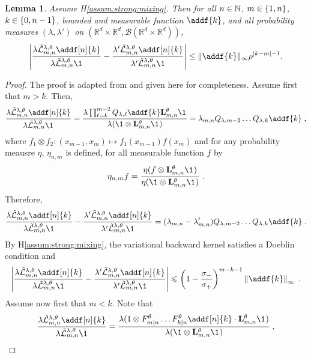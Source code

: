 \documentclass{article}
\newtheorem{lemma}[theorem]{Lemma}
\begin{document}
\begin{lemma} \label{lem:geo:bound}
Assume H\ref{assum:strong:mixing}. Then for all $n \in \mathbb{N}$, $m \in \{ 1, n \}$, $k \in \{ 0, n - 1 \}$, bounded and measurable function $\addf{k}$, and all probability measures $(\lambda, \lambda')$ on $(\mathbb{R}^d\times\mathbb{R}^d,\mathcal{B}(\mathbb{R}^d\times \mathbb{R}^d))$, 
$$
\left|\frac{\lambda \tilde{\mathcal{L}}^{\parvar,\parvec}_{m, n} \addf[n]{k}}{\lambda \tilde{\mathcal{L}}^{\parvar,\parvec}_{m, n} \1_{}} - \frac{\lambda' \tilde{\mathcal{L}}^{\parvar,\parvec}_{m, n} \addf[n]{k}}{\lambda'  \tilde{\mathcal{L}}^{\parvar,\parvec}_{m, n} \1} \right| \leq \| \addf{k} \|_\infty \rho^{|k - m| - 1}. 
$$
\end{lemma}
\begin{proof}
The proof is adapted from  \cite[Lemma~D.3]{gloaguen2019pseudo} and given here for completeness. Assume first that $m>k$. Then,
$$
\frac{\lambda \tilde{\mathcal{L}}^{\parvar,\parvec}_{m, n} \addf[n]{k}}{\lambda \tilde{\mathcal{L}}^{\parvar,\parvec}_{m, n} \1_{}} = \frac{\lambda \prod_{\ell = k}^{m-2}Q_{\parvar,\ell}\addf{k}\uk{m, n}{\parvec}\1_{}}{\lambda(\1\otimes \uk{m, n}{\parvec}\1_{})} = \lambda_{m,n}Q_{\parvar,m-2}\ldots Q_{\parvar,k}\addf{k}\eqsp,
$$
where $f_1\otimes f_2: (x_{m-1},x_m) \mapsto f_1(x_{m-1})f(x_m)$ and for any probability meausre $\eta$, $\eta_{n,m}$ is defined, for all measurable function $f$ by
$$
\eta_{n,m}f = \frac{\eta (f\otimes \uk{m, n}{\parvec}\1_{})}{\eta (\1\otimes \uk{m, n}{\parvec}\1_{})}\eqsp.
$$
Therefore,
$$
\frac{\lambda \tilde{\mathcal{L}}^{\parvar,\parvec}_{m, n} \addf[n]{k}}{\lambda \tilde{\mathcal{L}}^{\parvar,\parvec}_{m, n} \1_{}} - \frac{\lambda' \tilde{\mathcal{L}}^{\parvar,\parvec}_{m, n} \addf[n]{k}}{\lambda'  \tilde{\mathcal{L}}^{\parvar,\parvec}_{m, n} \1}  = (\lambda_{m,n}-\lambda'_{m,n})Q_{\parvar,m-2} \ldots Q_{\parvar,k}\addf{k}\eqsp.
$$
By H\ref{assum:strong:mixing}, the variational backward kernel satisfies a Doeblin condition and 
$$
\left|\frac{\lambda \tilde{\mathcal{L}}^{\parvar,\parvec}_{m, n} \addf[n]{k}}{\lambda \tilde{\mathcal{L}}^{\parvar,\parvec}_{m, n} \1_{}} - \frac{\lambda' \tilde{\mathcal{L}}^{\parvar,\parvec}_{m, n} \addf[n]{k}}{\lambda'  \tilde{\mathcal{L}}^{\parvar,\parvec}_{m, n} \1} \right|\leqslant  \left(1-\frac{\sigma_-}{\sigma_+}\right)^{m-k-1}\left\|\addf{k}\right\|_\infty\eqsp.
$$
Assume now first that $m< k$. Note that 
$$
\frac{\lambda\tilde{\mathcal{L}}^{\parvar,\parvec}_{m, n} \addf[n]{k}}{\lambda\tilde{\mathcal{L}}^{\parvar,\parvec}_{m, n} \1_{}}= \frac{\lambda(1\otimes F^\parvec_{m|n}\ldots F^\parvec_{k|n}\addf[n]{k}\cdot\uk{m, n}{\parvec}\1_{})}{\lambda (\1\otimes  \uk{m, n}{\parvec}\1_{})}\eqsp, 
$$
\end{proof}
\end{document}
